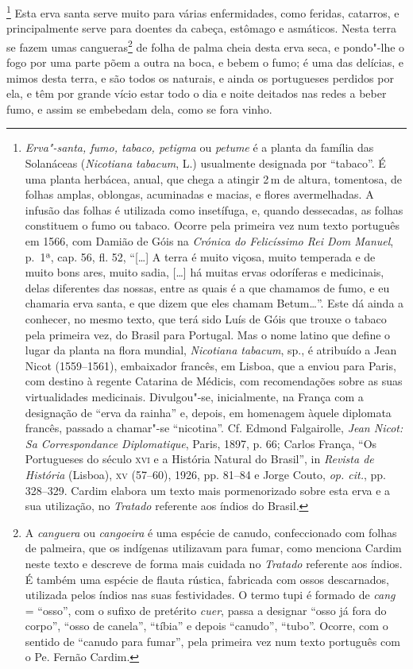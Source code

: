 \footnote{ \textit{Erva"-santa, fumo, tabaco,
petigma} ou \textit{petume} é a planta da família das Solanáceas
(\textit{Nicotiana tabacum}, L.) usualmente designada por ``tabaco''. É
uma planta herbácea, anual, que chega a atingir 2\,m de altura,
tomentosa, de folhas amplas, oblongas, acuminadas e macias, e flores
avermelhadas. A infusão das folhas é utilizada como insetífuga, e,
quando dessecadas, as folhas constituem o fumo ou tabaco. Ocorre pela
primeira vez num texto português em 1566, com Damião de Góis na
\textit{Crónica do Felicíssimo Rei Dom Manuel}, p.~1ª, cap. 56, fl. 52,
``[\ldots{}] A terra é muito viçosa, muito temperada e de muito bons ares,
muito sadia, [\ldots{}] há muitas ervas odoríferas e medicinais, delas
diferentes das nossas, entre as quais é a que chamamos de fumo, e eu
chamaria erva santa, e que dizem que eles chamam Betum\ldots{}''. Este dá
ainda a conhecer, no mesmo texto, que terá sido Luís de Góis que
trouxe o tabaco pela primeira vez, do Brasil para Portugal. Mas o
nome latino que define o lugar da planta na flora mundial,
\textit{Nicotiana tabacum}, sp., é atribuído a Jean Nicot (1559--1561), 
embaixador francês, em Lisboa, que a enviou para Paris, com destino à
regente Catarina de Médicis, com recomendações sobre as suas
virtualidades medicinais. Divulgou"-se, inicialmente, na França com a
designação de ``erva da rainha'' e, depois, em homenagem àquele diplomata
francês, passado a chamar"-se ``nicotina''. Cf. Edmond Falgairolle,
\textit{Jean Nicot: Sa Correspondance Diplomatique}, Paris, 1897, p.
66; Carlos França, ``Os Portugueses do século \textsc{xvi} e a História Natural
do Brasil'', in \textit{Revista de História} (Lisboa), \textsc{xv} (57--60),
1926, pp. 81--84 e Jorge Couto, \textit{op. cit.}, pp. 328--329. Cardim
elabora um texto mais pormenorizado sobre esta erva e a sua utilização,
no \textit{Tratado} referente aos índios do Brasil.} Esta
erva santa serve muito para várias enfermidades, como feridas,
catarros, e principalmente serve para doentes da cabeça, estômago e
asmáticos. Nesta terra se fazem umas cangueras\footnote{ A
\textit{canguera} ou \textit{cangoeira} é uma espécie de canudo,
confeccionado com folhas de palmeira, que os indígenas utilizavam para
fumar, como menciona Cardim neste texto e descreve de forma mais
cuidada no \textit{Tratado} referente aos índios. É também uma espécie
de flauta rústica, fabricada com ossos descarnados, utilizada pelos
índios nas suas festividades. O termo tupi é formado de \textit{cang} =
``osso'', com o sufixo de pretérito \textit{cuer}, passa a designar ``osso
já fora do corpo'', ``osso de canela'', ``tíbia'' e depois ``canudo'', ``tubo''.
Ocorre, com o sentido de ``canudo para fumar'', pela primeira vez num
texto português com o Pe. Fernão Cardim.} de folha de palma cheia desta
erva seca, e pondo"-lhe o fogo por uma parte põem a outra na boca, e
bebem o fumo; é uma das delícias, e mimos desta terra, e são todos os
naturais, e ainda os portugueses perdidos por ela, e têm por grande
vício estar todo o dia e noite deitados nas redes a beber fumo, e assim
se embebedam dela, como se fora vinho. 

